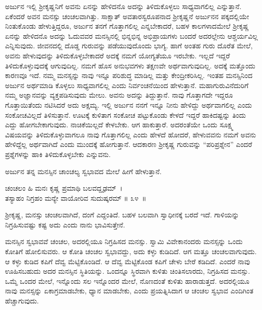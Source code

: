 ಅರ್ಜುನ ಇಲ್ಲಿ ಶ‍್ರೀಕೃಷ್ಣನಿಗೆ ಅವನು ಏನನ್ನು ಹೇಳಿದನೊ ಅದನ್ನು ತಿಳಿದುಕೊಳ್ಳಲು ಸಾಧ್ಯವಾಗಲಿಲ್ಲ ಎನ್ನುತ್ತಾನೆ. ಏಕೆಂದರೆ ಅವನ ಮನಸ್ಸು ಚಂಚಲವಾಗಿತ್ತು. ಸಾಕ್ಷಾತ್ ಅವತಾರಸ್ವರೂಪನಾದ ಶ‍್ರೀಕೃಷ್ಣನೆ ಅರ್ಜುನನ ಪಕ್ಕದಲ್ಲಿಯೇ ನಿಂತುಕೊಂಡು ಹೇಳುತ್ತಿದ್ದರೂ, ಅರ್ಜುನ ತನಗೆ ಗೊತ್ತಾಗಲಿಲ್ಲ ಎನ್ನಬೇಕಾದರೆ, ಬಹಳ ಕಾಲಗಳಾದಮೇಲೆ ಶ‍್ರೀಕೃಷ್ಣ ಏನನ್ನು ಹೇಳಿದನೊ ಅದನ್ನು ಓದುವವರ ಮನಸ್ಸಿನಲ್ಲಿ ಭಿನ್ನಭಿನ್ನ ಅಭಿಪ್ರಾಯಗಳು ಬಂದರೆ ಅದರಲ್ಲೇನು ಆಶ್ಚರ್ಯವಿಲ್ಲ ಎನ್ನಿಸುವುದು. ಜೀವನದಲ್ಲಿ ದೊಡ್ಡ ಗುರುವನ್ನು ಪಡೆಯುವುದೊಂದು ಭಾಗ್ಯ. ಹಾಗೆ ಅಂತಹ ಗುರು ದೊರೆತ ಮೇಲೆ, ಅವನು ಹೇಳುವುದನ್ನು ತಿಳಿದುಕೊಳ್ಳಬೇಕಾದರೆ ಅದಕ್ಕೆ ನಮಗೆ ಯೋಗ್ಯತೆಯೂ ಇರಬೇಕು. ಇಲ್ಲದೆ ಇದ್ದರೆ ತಿಳಿದುಕೊಳ್ಳುವುದಕ್ಕೆ ಆಗುವುದಿಲ್ಲ. ನಮಗೆ ಹೊಸ ಅನುಭವಗಳು ತಕ್ಷಣವೇ ಅರ್ಥವಾಗುವುದಿಲ್ಲ. ಅದಕ್ಕೆ ಮತ್ತೊಂದು ಕಾರಣವೂ ಇದೆ. ನಮ್ಮ ಮನಸ್ಸನ್ನು ನಾವು ಇನ್ನೂ ಪರಿಶುದ್ಧ ಮಾಡಿಲ್ಲ ಮತ್ತು ಕೇಂದ್ರೀಕರಿಸಿಲ್ಲ. ಇಂತಹ ಮನಸ್ಸಿನಿಂದ ಅರ್ಜುನ ಅರ್ಥಮಾಡಿ ಕೊಳ್ಳಲು ಸಾಧ್ಯವಾಗಲಿಲ್ಲ ಎಂದು ನಿರ್ವಂಚನೆಯಿಂದ ಹೇಳುತ್ತಾನೆ. ಮಹಾಗುರುವಿನೆದುರಿಗೆ ನಮ್ಮ ಅಜ್ಞಾನವನ್ನು ವ್ಯಕ್ತಪಡಿಸುವುದು ಮೇಲು. ಅವನು ಅದನ್ನು ತಿದ್ದುತ್ತಾನೆ. ನಾವು ಗೊತ್ತಾಗದೇ ಇದ್ದರೂ ಗೊತ್ತಾಯಿತೆಂದು ನಟಿಸಿದರೆ ಅದು ಅಕ್ಷಮ್ಯ. ಇಲ್ಲಿ ಅರ್ಜುನ ನನಗೆ ಇನ್ನೂ ನೀನು ಹೇಳಿದ್ದು ಅರ್ಥವಾಗಲಿಲ್ಲ ಎಂದು ಸಂಕೋಚವಿಲ್ಲದೆ ತಿಳಿಸುತ್ತಾನೆ. ಊಟಕ್ಕೆ ಕುಳಿತಾಗ ಸಂಕೋಚ ಪಟ್ಟುಕೊಂಡು ಕೇಳದೆ ಇದ್ದರೆ ಹಾಕಿದಷ್ಟನ್ನು ತಿಂದು ಎದ್ದು ಹೋಗಬೇಕಾಗುವುದು. ನಾಚಿಕೆಯಿಲ್ಲದೆ ಕೇಳಬೇಕು. ಆಗ ಹಾಕುತ್ತಾರೆ. ಅದರಂತೆಯೇ ಒಂದು ಸೂಕ್ಷ್ಮ ವಿಷಯವನ್ನು ತಿಳಿದುಕೊಳ್ಳುವಾಗಲೂ ನಾವು ಗೊತ್ತಾಗಲಿಲ್ಲ ಎಂದು ಹೇಳದೆ ಹೋದರೆ, ಹೇಳುವವನು ನಮಗೆ ಅವನು ಹೇಳಿದ್ದೆಲ್ಲ ಅರ್ಥವಾಗಿದೆ ಎಂದು ಮುಂದಕ್ಕೆ ಹೋಗುತ್ತಾನೆ. ಆದಕಾರಣ ಶ‍್ರೀಕೃಷ್ಣ ಗುರುವನ್ನು “ಪರಿಪ್ರಶ್ನೇನ” ಎಂದರೆ ಪ್ರಶ್ನೆಗಳನ್ನು ಹಾಕಿ ತಿಳಿದುಕೊಳ್ಳಬೇಕು ಎನ್ನುವನು.

ಅರ್ಜುನ ತನ್ನ ಮನಸ್ಸಿನ ಚಾಂಚಲ್ಯ ಸ್ವಭಾವದ ಮೇಲೆ ಹೀಗೆ ಹೇಳುತ್ತಾನೆ.

\begin{shloka}
ಚಂಚಲಂ ಹಿ ಮನಃ ಕೃಷ್ಣ ಪ್ರಮಾಥಿ ಬಲವದ್ದೃಢಮ್~।\\ತಸ್ಯಾಹಂ ನಿಗ್ರಹಂ ಮನ್ಯೇ ವಾಯೋರಿವ ಸುದುಷ್ಕರಮ್ \hfill॥ ೩೪~॥
\end{shloka}

\begin{artha}
ಶ‍್ರೀಕೃಷ್ಣ, ಮನಸ್ಸು ಚಂಚಲವಾಗಿದೆ, ದಂಗೆ ಎದ್ದಂತಿದೆ. ಬಹಳ ಬಲವಾಗಿ ಸ್ವಾಧೀನಕ್ಕೆ ಬರದೆ ಇದೆ. ಗಾಳಿಯನ್ನು ನಿಗ್ರಹಿಸುವಷ್ಟು ಕಷ್ಟ ಅದು ಎಂದು ನಾನು ಭಾವಿಸುತ್ತೇನೆ.
\end{artha}

ಮನಸ್ಸಿನ ಸ್ವಭಾವವೆ ಚಂಚಲ, ಅದರಲ್ಲಿಯೂ ನಿಗ್ರಹಿಸದ ಮನಸ್ಸು. ಸ್ವಾಮಿ ವಿವೇಕಾನಂದರು ಮನಸ್ಸನ್ನು ಒಂದು ಕೋತಿಗೆ ಹೋಲಿಸುವರು. ಆ ಕೋತಿ ಚಂಚಲ ಸ್ವಭಾವದ್ದು, ಅದು ಕಳ್ಳು ಕುಡಿದಿದೆ. ಆಗ ಮತ್ತೂ ಚಂಚಲವಾಗುವುದು. ಆ ಕಳ್ಳು ಕುಡಿದ ಕಪಿಗೆ ದೆವ್ವ ಮೆಟ್ಟಿಕೊಂಡಿದೆ. ಆ ದೆವ್ವ ಮೆಟ್ಟಿಕೊಂಡ ಕಪಿಗೆ ಚೇಳು ಬೇರೆ ಕಡಿದಿದೆ. ಎಂದರೆ ನಾವು ಊಹಿಸಬಹುದು ಅದರ ಮನಸ್ಸಿನ ಸ್ಥಿತಿಯನ್ನು. ಒಂದನ್ನೂ ಸ್ಥಿರವಾಗಿ ಕುಳಿತು ಚಿಂತಿಸಲಾರದು, ನಿಗ್ರಹಿಸದ ಮನಸ್ಸು. ಒಮ್ಮೆ ಒಂದರ ಮೇಲೆ, ಇನ್ನೊಂದು ಸಲ ಇನ್ನೊಂದರ ಮೇಲೆ, ನೊಣದಂತೆ ಕುಳಿತು ಹಾರಾಡುತ್ತದೆ. ಅದರಲ್ಲಿಯೂ ನಾವು ಮನಸ್ಸನ್ನು ಏಕಾಗ್ರಮಾಡಬೇಕು, ಧ್ಯಾನ ಮಾಡಬೇಕು, ಎಂದು ಪ್ರಯತ್ನಿಸಿದಾಗ ಆ ಚಂಚಲ ಸ್ವಭಾವ ಎಂದಿಗಿಂತ ಹೆಚ್ಚಾಗುವುದು.

